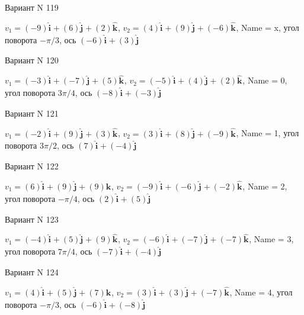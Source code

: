 \documentclass[11pt]{report}
\begin{document}
Вариант N 119

$v_1 = \left(-9\right)\mathbf{\hat{i}_{}} + \left(6\right)\mathbf{\hat{j}_{}} + \left(2\right)\mathbf{\hat{k}_{}}$, $v_2 = \left(4\right)\mathbf{\hat{i}_{}} + \left(9\right)\mathbf{\hat{j}_{}} + \left(-6\right)\mathbf{\hat{k}_{}}$, Name = x, угол поворота $- \pi / 3$, ось $\left(-6\right)\mathbf{\hat{i}_{}} + \left(3\right)\mathbf{\hat{j}_{}}$

Вариант N 120

$v_1 = \left(-3\right)\mathbf{\hat{i}_{}} + \left(-7\right)\mathbf{\hat{j}_{}} + \left(5\right)\mathbf{\hat{k}_{}}$, $v_2 = \left(-5\right)\mathbf{\hat{i}_{}} + \left(4\right)\mathbf{\hat{j}_{}} + \left(2\right)\mathbf{\hat{k}_{}}$, Name = 0, угол поворота $3 \pi / 4$, ось $\left(-8\right)\mathbf{\hat{i}_{}} + \left(-3\right)\mathbf{\hat{j}_{}}$

Вариант N 121

$v_1 = \left(-2\right)\mathbf{\hat{i}_{}} + \left(9\right)\mathbf{\hat{j}_{}} + \left(3\right)\mathbf{\hat{k}_{}}$, $v_2 = \left(3\right)\mathbf{\hat{i}_{}} + \left(8\right)\mathbf{\hat{j}_{}} + \left(-9\right)\mathbf{\hat{k}_{}}$, Name = 1, угол поворота $3 \pi / 2$, ось $\left(7\right)\mathbf{\hat{i}_{}} + \left(-4\right)\mathbf{\hat{j}_{}}$

Вариант N 122

$v_1 = \left(6\right)\mathbf{\hat{i}_{}} + \left(9\right)\mathbf{\hat{j}_{}} + \left(9\right)\mathbf{\hat{k}_{}}$, $v_2 = \left(-9\right)\mathbf{\hat{i}_{}} + \left(-6\right)\mathbf{\hat{j}_{}} + \left(-2\right)\mathbf{\hat{k}_{}}$, Name = 2, угол поворота $- \pi / 4$, ось $\left(2\right)\mathbf{\hat{i}_{}} + \left(5\right)\mathbf{\hat{j}_{}}$

Вариант N 123

$v_1 = \left(-4\right)\mathbf{\hat{i}_{}} + \left(5\right)\mathbf{\hat{j}_{}} + \left(9\right)\mathbf{\hat{k}_{}}$, $v_2 = \left(-6\right)\mathbf{\hat{i}_{}} + \left(-7\right)\mathbf{\hat{j}_{}} + \left(-7\right)\mathbf{\hat{k}_{}}$, Name = 3, угол поворота $7 \pi / 4$, ось $\left(-7\right)\mathbf{\hat{i}_{}} + \left(-4\right)\mathbf{\hat{j}_{}}$

Вариант N 124

$v_1 = \left(4\right)\mathbf{\hat{i}_{}} + \left(5\right)\mathbf{\hat{j}_{}} + \left(7\right)\mathbf{\hat{k}_{}}$, $v_2 = \left(3\right)\mathbf{\hat{i}_{}} + \left(3\right)\mathbf{\hat{j}_{}} + \left(-7\right)\mathbf{\hat{k}_{}}$, Name = 4, угол поворота $- \pi / 3$, ось $\left(-6\right)\mathbf{\hat{i}_{}} + \left(-8\right)\mathbf{\hat{j}_{}}$
\end{document}

